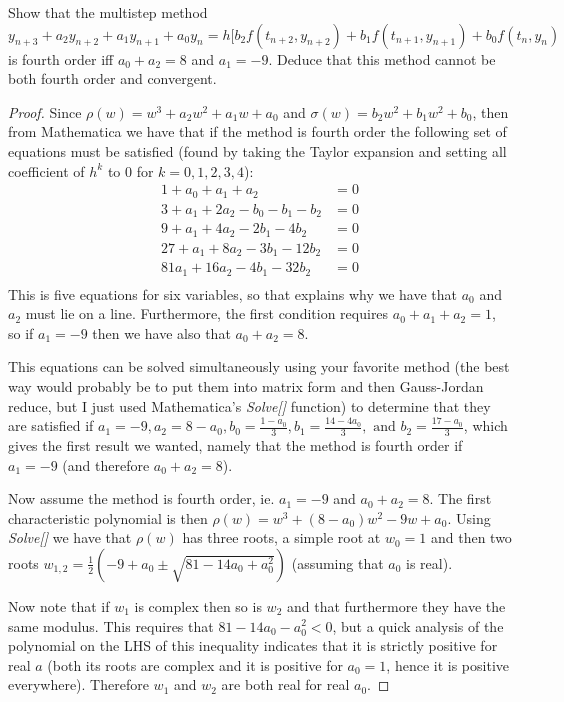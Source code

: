 \documentclass[10pt,a4paper]{article}
\newenvironment{problem}[2][Problem]{\begin{trivlist}
\item[\hskip \labelsep {\bfseries #1}\hskip \labelsep {\bfseries #2.}]}{\end{trivlist}}
\begin{document}
\begin{problem}{3}
Show that the multistep method $y_{n+3} + a_2 y_{n+2} + a_1 y_{n+1} + a_0 y_n = h[b_2 f(t_{n+2},y_{n+2}) + b_1 f(t_{n+1},y_{n+1}) + b_0 f(t_n,y_n)$ is fourth order iff $a_0 + a_2 = 8$ and $a_1 = -9$.  Deduce that this method cannot be both fourth order and convergent.
\end{problem}
\begin{proof}
Since $\rho(w) = w^3 + a_2 w^2 + a_1 w + a_0$ and $\sigma(w) = b_2 w^2 + b_1 w^2 + b_0$, then from Mathematica we have that if the method is fourth order the following set of equations must be satisfied (found by taking the Taylor expansion and setting all coefficient of $h^k$ to 0 for $k=0,1,2,3,4$):
\begin{equation}
\begin{split}
1 + a_0 + a_1 + a_2 &= 0\\
3 + a_1 + 2 a_2 - b_0 - b_1 - b_2 &= 0\\
9 + a_1 + 4 a_2 - 2 b_1 -4 b_2 &= 0\\
27 + a_1 + 8 a_2 - 3 b_1 -12 b_2 &=0\\
81 a_1 + 16 a_2 - 4 b_1 -32 b_2 &= 0\\
\end{split}
\end{equation}
This is five equations for six variables, so that explains why we have that $a_0$ and $a_2$ must lie on a line.  Furthermore, the first condition requires $a_0 + a_1 + a_2 = 1$, so if $a_1 = -9$ then we have also that $a_0 + a_2 = 8$.

This equations can be solved simultaneously using your favorite method (the best way would probably be to put them into matrix form and then Gauss-Jordan reduce, but I just used Mathematica's \textit{Solve[]} function) to determine that they are satisfied if $a_1 = -9, a_2 = 8-a_0, b_0 = \frac{1-a_0}{3}, b_1 = \frac{14-4a_0}{3}, \text{ and } b_2 = \frac{17 - a_0}{3}$, which gives the first result we wanted, namely that the method is fourth order if $a_1 = -9$ (and therefore $a_0 + a_2 = 8$).

Now assume the method is fourth order, ie. $a_1 = -9$ and $a_0 + a_2 = 8$.  The first characteristic polynomial is then $\rho(w) = w^3 + (8-a_0) w^2 - 9 w + a_0$.  Using \textit{Solve[]} we have that $\rho(w)$ has three roots, a simple root at $w_0=1$ and then two roots $w_{1,2} = \frac{1}{2} \left( -9 + a_0 \pm \sqrt{81 - 14 a_0 + a_0^2} \right)$ (assuming that $a_0$ is real).

Now note that if $w_1$ is complex then so is $w_2$ and that furthermore they have the same modulus.  This requires that $81 - 14 a_0 - a_0^2 <0$, but a quick analysis of the polynomial on the LHS of this inequality indicates that it is strictly positive for real $a$ (both its roots are complex and it is positive for $a_0 =1$, hence it is positive everywhere).  Therefore $w_1$ and $w_2$ are both real for real $a_0$.


\end{proof}
\end{document}
